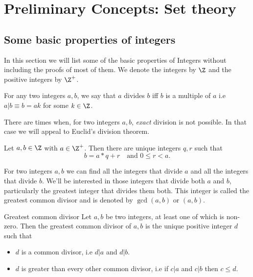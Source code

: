 \chapter{Preliminary Concepts: Set theory}

\section{Some basic properties of integers}\label{App:integers}
In this section we will list some of the basic properties of Integers without including the proofs
of most of them. We denote the integers by $\Z$ and the positive integers by $\Z^{+}$. 
\begin{Definition}
    For any two integers $a,b$, we say that $a$ divides $b$ iff $b$ is a multiple of $a$ i.e 
    $ a | b \equiv b = ak$ for some $k \in \Z$.
\end{Definition}

There are times when, for two integers $a,b$, \emph{exact} division is not possible. In that case we
will appeal to Euclid's division theorem.

\begin{Theorem}[name= Division Theorem]
    Let $a,b \in \Z$ with $a \in \Z^{+}$. Then there are unique integers $q,r$ such that
    \begin{equation*}
	b = a*q + r \quad \text{and } 0\leq r < a.
    \end{equation*}
\label{thm:div}
\end{Theorem}

For two integers $a,b$ we can find all the integers that divide $a$ and all the integers that divide
$b$. We'll be interested in those integers that divide both $a$ and $b$, particularly the greatest
integer that divides them both. This integer is called the greatest common divisor and is denoted by
$\gcd(a,b)$ or $(a,b)$.
\begin{Definition}{Greatest common divisor}
    Let $a,b$ be two integers, at least one of which is non-zero. Then the greatest common divisor
    of $a,b$ is the unique positive integer $d$ such that
    \begin{itemize}
	\item $d$ is a common divisor, i.e $ d | a$ and $d | b$.
	\item $d$ is greater than every other common divisor, i.e if $ c | a$ and $c | b$ then $c
	    \leq d$.
    \end{itemize}
\end{Definition}

